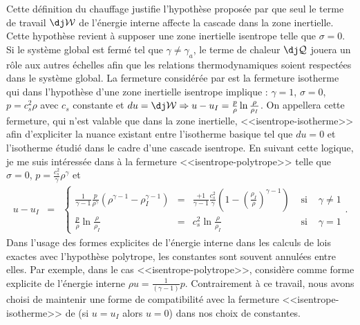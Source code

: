Cette définition du chauffage justifie l'hypothèse proposée par \cite{galtier_exact_2011} que seul le terme de travail $\dj \mathcal{W}$ de l'énergie interne affecte la cascade dans la zone inertielle. Cette hypothèse revient à supposer une zone inertielle isentrope telle que $\sigma = 0$. Si le système global est fermé tel que $\gamma \neq \gamma_a$, le terme de chaleur $\dj \mathcal{Q}$ jouera un rôle aux autres échelles afin que les relations thermodynamiques soient respectées dans le système global. La fermeture considérée par \cite{galtier_exact_2011} est la fermeture isotherme qui dans l'hypothèse d'une zone inertielle isentrope implique :  $\gamma = 1$, $\sigma = 0$, $p = c^2_s \rho$ avec $c_s$ constante et $du = \dj \mathcal{W} \Rightarrow u-u_I = \frac{p}{\rho} \ln \frac{\rho}{\rho_I} $. On appellera cette fermeture, qui n'est valable que dans la zone inertielle, <<isentrope-isotherme>> afin d'expliciter la nuance existant entre l'isotherme basique tel que $du = 0$ et l'isotherme étudié dans le cadre d'une cascade isentrope. En suivant cette logique, je me suis intéressée dans \cite{simon_general_2021} à la fermeture <<isentrope-polytrope>> telle que $\sigma = 0$,  $p = \frac{c_s^2}{\gamma} \rho^{\gamma}$ et 
\begin{eqnarray}
\label{eq:thermo_ipol_u} u - u_I &=& \left\{ \begin{array}{lclcl} \frac{1 }{\gamma-1} \frac{p}{\rho^{\gamma}} \left(\rho^{\gamma-1} - \rho_I^{\gamma-1}\right) &=& \frac{+1 }{\gamma-1} \frac{c_s^2}{\gamma} \left(1 - \left(\frac{\rho_I}{\rho}\right)^{\gamma-1}\right)  & \textrm{ si } & \gamma \neq 1\\
    \frac{p}{\rho} \ln \frac{\rho}{\rho_I} &=&  c_s^2 \ln \frac{\rho}{\rho_I} &\textrm{ si }&  \gamma = 1 
   \end{array} \right. .
\end{eqnarray} 
Dans l'usage des formes explicites de l'énergie interne dans les calculs de lois exactes avec l'hypothèse polytrope, les constantes sont souvent annulées entre elles. Par exemple, dans le cas <<isentrope-polytrope>>, \cite{banerjee_kolmogorov-like_2014} considère comme forme explicite de l'énergie interne $ \rho u = \frac{1}{\left(\gamma-1\right)} p $. Contrairement à ce travail, nous avons choisi de maintenir une forme de compatibilité avec la fermeture <<isentrope-isotherme>> de \cite{galtier_exact_2011} (si $u = u_I$ alors $u = 0$) dans nos choix de constantes.

